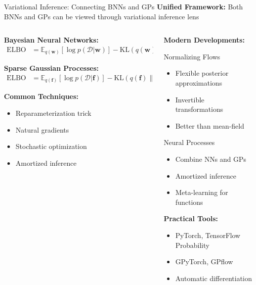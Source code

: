 \documentclass[aspectratio=169,11pt]{beamer}
\newcommand{\E}{\mathbb{E}}
\newcommand{\KL}{\text{KL}}
\newcommand{\bw}{\mathbf{w}}
\begin{document}
\begin{frame}{Variational Inference: Connecting BNNs and GPs}
\textbf{Unified Framework:} Both BNNs and GPs can be viewed through variational inference lens

\begin{columns}
\begin{column}{0.5\textwidth}
\textbf{Bayesian Neural Networks:}
\begin{align}
\text{ELBO} &= \E_{q(\bw)}[\log p(\mathcal{D}|\bw)] - \KL(q(\bw) \| p(\bw))
\end{align}

\textbf{Sparse Gaussian Processes:}
\begin{align}
\text{ELBO} &= \E_{q(\mathbf{f})}[\log p(\mathcal{D}|\mathbf{f})] - \KL(q(\mathbf{f}) \| p(\mathbf{f}))
\end{align}

\textbf{Common Techniques:}
\begin{itemize}
\item Reparameterization trick
\item Natural gradients
\item Stochastic optimization
\item Amortized inference
\end{itemize}
\end{column}
\begin{column}{0.5\textwidth}
\textbf{Modern Developments:}

\begin{block}{Normalizing Flows}
\begin{itemize}
\item Flexible posterior approximations
\item Invertible transformations
\item Better than mean-field
\end{itemize}
\end{block}

\begin{block}{Neural Processes}
\begin{itemize}
\item Combine NNs and GPs
\item Amortized inference
\item Meta-learning for functions
\end{itemize}
\end{block}

\textbf{Practical Tools:}
\begin{itemize}
\item PyTorch, TensorFlow Probability
\item GPyTorch, GPflow
\item Automatic differentiation
\end{itemize}
\end{column}
\end{columns}
\end{frame}
\end{document}
